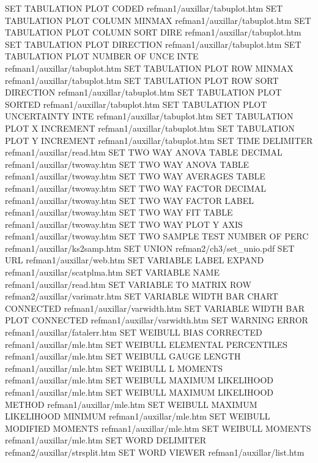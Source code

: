 SET TABULATION PLOT CODED               refman1/auxillar/tabuplot.htm
SET TABULATION PLOT COLUMN MINMAX       refman1/auxillar/tabuplot.htm
SET TABULATION PLOT COLUMN SORT DIRE    refman1/auxillar/tabuplot.htm
SET TABULATION PLOT DIRECTION           refman1/auxillar/tabuplot.htm
SET TABULATION PLOT NUMBER OF UNCE INTE refman1/auxillar/tabuplot.htm
SET TABULATION PLOT ROW MINMAX          refman1/auxillar/tabuplot.htm
SET TABULATION PLOT ROW SORT DIRECTION  refman1/auxillar/tabuplot.htm
SET TABULATION PLOT SORTED              refman1/auxillar/tabuplot.htm
SET TABULATION PLOT UNCERTAINTY INTE    refman1/auxillar/tabuplot.htm
SET TABULATION PLOT X INCREMENT         refman1/auxillar/tabuplot.htm
SET TABULATION PLOT Y INCREMENT         refman1/auxillar/tabuplot.htm
SET TIME DELIMITER                      refman1/auxillar/read.htm
SET TWO WAY ANOVA TABLE DECIMAL         refman1/auxillar/twoway.htm
SET TWO WAY ANOVA TABLE                 refman1/auxillar/twoway.htm
SET TWO WAY AVERAGES TABLE              refman1/auxillar/twoway.htm
SET TWO WAY FACTOR DECIMAL              refman1/auxillar/twoway.htm
SET TWO WAY FACTOR LABEL                refman1/auxillar/twoway.htm
SET TWO WAY FIT TABLE                   refman1/auxillar/twoway.htm
SET TWO WAY PLOT Y AXIS                 refman1/auxillar/twoway.htm
SET TWO SAMPLE TEST NUMBER OF PERC      refman1/auxillar/ks2samp.htm
SET UNION                               refman2/ch3/set_unio.pdf
SET URL                                 refman1/auxillar/web.htm
SET VARIABLE LABEL EXPAND               refman1/auxillar/scatplma.htm
SET VARIABLE NAME                       refman1/auxillar/read.htm
SET VARIABLE TO MATRIX ROW              refman2/auxillar/varimatr.htm
SET VARIABLE WIDTH BAR CHART CONNECTED  refman1/auxillar/varwidth.htm
SET VARIABLE WIDTH BAR PLOT CONNECTED   refman1/auxillar/varwidth.htm
SET WARNING ERROR                       refman1/auxillar/fatalerr.htm
SET WEIBULL BIAS CORRECTED              refman1/auxillar/mle.htm
SET WEIBULL ELEMENTAL PERCENTILES       refman1/auxillar/mle.htm
SET WEIBULL GAUGE LENGTH                refman1/auxillar/mle.htm
SET WEIBULL L MOMENTS                   refman1/auxillar/mle.htm
SET WEIBULL MAXIMUM LIKELIHOOD          refman1/auxillar/mle.htm
SET WEIBULL MAXIMUM LIKELIHOOD METHOD   refman1/auxillar/mle.htm
SET WEIBULL MAXIMUM LIKELIHOOD MINIMUM  refman1/auxillar/mle.htm
SET WEIBULL MODIFIED MOMENTS            refman1/auxillar/mle.htm
SET WEIBULL MOMENTS                     refman1/auxillar/mle.htm
SET WORD DELIMITER                      refman2/auxillar/strsplit.htm
SET WORD VIEWER                         refman1/auxillar/list.htm
